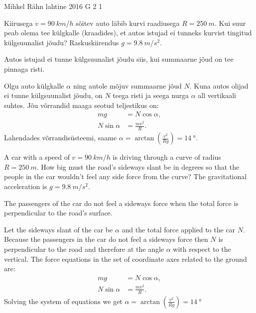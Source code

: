 {Mihkel Rähn} %
{lahtine} %
{2016} %
{G 2} %
{1} %
{
\ifStatement
Kiirusega $v=\SI{90}{km/h}$ sõitev auto läbib kurvi raadiusega $R=\SI{250}{m}$. Kui suur peab olema tee külgkalle (kraadides), et autos istujad ei tunneks kurvist tingitud külgsuunalist jõudu? Raskuskiirendus $g=\SI{9.8}{m/s^{2}}$.
\fi


\ifHint
Autos istujad ei tunne külgsuunalist jõudu siis, kui summaarne jõud on tee pinnaga risti.
\fi


\ifSolution
Olgu auto külgkalle $\alpha$ ning autole mõjuv summaarne jõud $N$. Kuna autos olijad ei tunne külgsuunalist jõudu, on $N$ teega risti ja seega nurga $\alpha$ all vertikaali suhtes. Jõu võrrandid maaga seotud teljestikus on:
\begin{align*}
mg &= N\cos \alpha,\\
N\sin\alpha &= \frac{mv^2}{R}.
\end{align*}
Lahendades võrrandisüsteemi, saame $\alpha = \arctan(\frac{v^2}{Rg}) = \SI{14}{\degree}$.
\fi


\ifEngStatement
A car with a speed of $v=\SI{90}{km/h}$ is driving through a curve of radius $R=\SI{250}{m}$. How big must the road’s sideways slant be in degrees so that the people in the car wouldn’t feel any side force from the curve? The gravitational acceleration is $g=\SI{9.8}{m/s^{2}}$.
\fi


\ifEngHint
The passengers of the car do not feel a sideways force when the total force is perpendicular to the road’s surface.
\fi


\ifEngSolution
Let the sideways slant of the car be $\alpha$ and the total force applied to the car $N$. Because the passengers in the car do not feel a sideways force then $N$ is perpendicular to the road and therefore at the angle $\alpha$ with respect to the vertical. The force equations in the set of coordinate axes related to the ground are: 
\begin{align*}
mg &= N\cos \alpha,\\
N\sin\alpha &= \frac{mv^2}{R}.
\end{align*}
Solving the system of equations we get $\alpha = \arctan(\frac{v^2}{Rg}) = \SI{14}{\degree}$
\fi
}